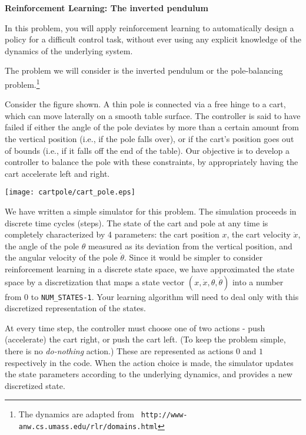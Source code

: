
\item {} {\bf Reinforcement Learning: The inverted pendulum}

In this problem, you will apply reinforcement learning to automatically
design a policy for a difficult control task, without ever using any 
explicit knowledge of the dynamics of the underlying system.

The problem we will consider is the inverted pendulum or the pole-balancing 
problem.\footnote{The dynamics are adapted from {\tt
    http://www-anw.cs.umass.edu/rlr/domains.html}}

Consider the figure shown. A thin pole is connected via a free hinge to a cart, 
which can move laterally on a smooth table surface. The controller is said to 
have failed if either the angle of the pole deviates by more than a certain
amount from the vertical position (i.e., if the pole falls over), or if the
cart's position goes out of bounds (i.e., if it falls off the end of the table).
Our objective is to develop a controller to balance the pole with these 
constraints, by appropriately having the cart accelerate left and right.


\begin{center}
  \texttt{[image: cartpole/cart\_pole.eps]}
\end{center}

We have written a simple simulator for this problem. The simulation 
proceeds in discrete time cycles (steps). The state of the cart and pole at any time 
is completely characterized by 4 parameters: the cart position $x$, the 
cart velocity $\dot{x}$, the angle of the pole $\theta$ measured as its deviation 
from the vertical position, and the angular velocity of the pole $\dot{\theta}$.  
Since it would be simpler to
consider reinforcement learning in a discrete state space,
we have approximated the state space by a discretization that maps 
a state vector $(x,\dot{x}, \theta, \dot{\theta})$ into a number
from 0 to {\tt NUM\_STATES-1}. Your learning algorithm will need to 
deal only with this discretized representation of the states.

At every time step, the controller must choose one of two actions -
push (accelerate) the cart right, or push the cart left.
(To keep the problem simple, there is no {\it do-nothing} action.)
These are represented as actions $0$ and $1$ respectively in the code.  
When the action choice is made, the simulator updates the state parameters 
according to the underlying dynamics, and provides a new discretized state.

